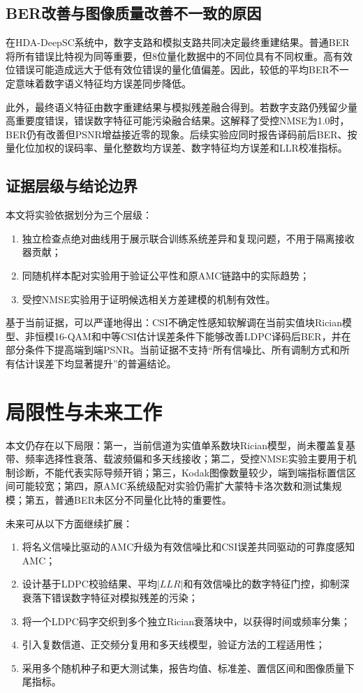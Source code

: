 \documentclass[UTF8,a4paper,11pt]{ctexart}
\newcommand{\HDADeepSC}{HDA-DeepSC}
\newcommand{\CSI}{CSI}
\newcommand{\AMC}{AMC}
\newcommand{\BER}{BER}
\newcommand{\PSNR}{PSNR}
\newcommand{\NMSE}{NMSE}
\newcommand{\LLR}{LLR}
\newcommand{\LDPC}{LDPC}
\begin{document}
\subsection{BER改善与图像质量改善不一致的原因}
在\HDADeepSC{}系统中，数字支路和模拟支路共同决定最终重建结果。普通\BER{}将所有错误比特视为同等重要，但8位量化数据中的不同位具有不同权重。高有效位错误可能造成远大于低有效位错误的量化值偏差。因此，较低的平均\BER{}不一定意味着数字语义特征均方误差同步降低。

此外，最终语义特征由数字重建结果与模拟残差融合得到。若数字支路仍残留少量高重要度错误，错误数字特征可能污染融合结果。这解释了受控\NMSE{}为1.0时，\BER{}仍有改善但\PSNR{}增益接近零的现象。后续实验应同时报告译码前后\BER{}、按量化位加权的误码率、量化整数均方误差、数字特征均方误差和\LLR{}校准指标。

\subsection{证据层级与结论边界}
本文将实验依据划分为三个层级：
\begin{enumerate}[label=\arabic*)]
  \item 独立检查点绝对曲线用于展示联合训练系统差异和复现问题，不用于隔离接收器贡献；
  \item 同随机样本配对实验用于验证公平性和原\AMC{}链路中的实际趋势；
  \item 受控\NMSE{}实验用于证明候选相关方差建模的机制有效性。
\end{enumerate}

基于当前证据，可以严谨地得出：\CSI{}不确定性感知软解调在当前实值块Rician模型、非恒模16-QAM和中等\CSI{}估计误差条件下能够改善\LDPC{}译码后\BER{}，并在部分条件下提高端到端\PSNR{}。当前证据不支持“所有信噪比、所有调制方式和所有估计误差下均显著提升”的普遍结论。

\section{局限性与未来工作}
本文仍存在以下局限：第一，当前信道为实值单系数块Rician模型，尚未覆盖复基带、频率选择性衰落、载波频偏和多天线接收；第二，受控\NMSE{}实验主要用于机制诊断，不能代表实际导频开销；第三，Kodak图像数量较少，端到端指标置信区间可能较宽；第四，原\AMC{}系统级配对实验仍需扩大蒙特卡洛次数和测试集规模；第五，普通\BER{}未区分不同量化比特的重要性。

未来可从以下方面继续扩展：
\begin{enumerate}[label=\arabic*)]
  \item 将名义信噪比驱动的\AMC{}升级为有效信噪比和\CSI{}误差共同驱动的可靠度感知\AMC{}；
  \item 设计基于\LDPC{}校验结果、平均$|\LLR|$和有效信噪比的数字特征门控，抑制深衰落下错误数字特征对模拟残差的污染；
  \item 将一个\LDPC{}码字交织到多个独立Rician衰落块中，以获得时间或频率分集；
  \item 引入复数信道、正交频分复用和多天线模型，验证方法的工程适用性；
  \item 采用多个随机种子和更大测试集，报告均值、标准差、置信区间和图像质量下尾指标。
\end{enumerate}
\end{document}
